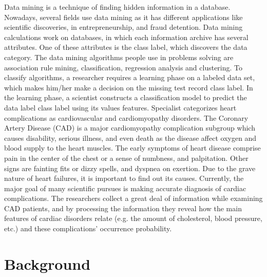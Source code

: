 \documentclass[sigconf]{acmart}
\begin{document}
Data mining is a technique of finding hidden information in a database. Nowadays, several fields use data mining as it has different applications like scientific discoveries, in entrepreneurship, and fraud detention. Data mining calculations work on databases, in which each information archive has several attributes.  One of these attributes is the class label, which discovers the data category. The data mining algorithms people use in problems solving are association rule mining, classification, regression analysis and clustering.
To classify algorithms, a researcher requires a learning phase on a labeled data set, which makes him/her make a decision on the missing test record class label. In the learning phase, a scientist constructs a classification model to predict the data label class label using its values features. Specialist categorizes heart complications as cardiovascular and cardiomyopathy disorders. The Coronary Artery Disease (CAD) is a major cardiomyopathy complication subgroup which causes disability, serious illness, and even death as the disease affect oxygen and blood supply to the heart muscles. The early symptoms of heart disease comprise pain in the center of the chest or a sense of numbness, and palpitation. Other signs are fainting fits or dizzy spells, and dyspnea on exertion. 	Due to the grave nature of heart failures, it is important to find out its causes. Currently, the major goal of many scientific pursues is making accurate diagnosis of cardiac complications. The researchers collect a great deal of information while examining CAD patients, and by processing the information they reveal how the main features of cardiac disorders relate (e.g. the amount of cholesterol, blood pressure, etc.) and these complications’ occurrence probability.

\section{Background}
\end{document}
